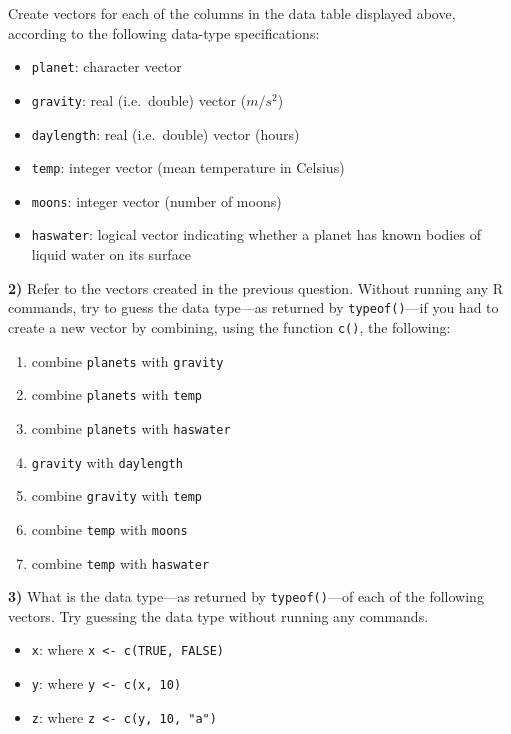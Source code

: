 \documentclass[
]{book}
\providecommand{\tightlist}{%
  \setlength{\itemsep}{0pt}\setlength{\parskip}{0pt}}
\begin{document}
Create vectors for each of the columns in the data table displayed above,
according to the following data-type specifications:

\begin{itemize}
\tightlist
\item
  \texttt{planet}: character vector
\item
  \texttt{gravity}: real (i.e.~double) vector (\(m/s^2\))
\item
  \texttt{daylength}: real (i.e.~double) vector (hours)
\item
  \texttt{temp}: integer vector (mean temperature in Celsius)
\item
  \texttt{moons}: integer vector (number of moons)
\item
  \texttt{haswater}: logical vector indicating whether a planet has known bodies of
  liquid water on its surface
\end{itemize}

\textbf{2)} Refer to the vectors created in the previous question. Without running
any R commands, try to guess the data type---as returned by \texttt{typeof()}---if you
had to create a new vector by combining, using the function \texttt{c()}, the
following:

\begin{enumerate}
\def\labelenumi{\alph{enumi})}
\item
  combine \texttt{planets} with \texttt{gravity}
\item
  combine \texttt{planets} with \texttt{temp}
\item
  combine \texttt{planets} with \texttt{haswater}
\item
  \texttt{gravity} with \texttt{daylength}
\item
  combine \texttt{gravity} with \texttt{temp}
\item
  combine \texttt{temp} with \texttt{moons}
\item
  combine \texttt{temp} with \texttt{haswater}
\end{enumerate}

\textbf{3)} What is the data type---as returned by \texttt{typeof()}---of each of the
following vectors. Try guessing the data type without running any commands.

\begin{itemize}
\item
  \texttt{x}: where \texttt{x\ \textless{}-\ c(TRUE,\ FALSE)}
\item
  \texttt{y}: where \texttt{y\ \textless{}-\ c(x,\ 10)}
\item
  \texttt{z}: where \texttt{z\ \textless{}-\ c(y,\ 10,\ "a")}
\end{itemize}
\end{document}
